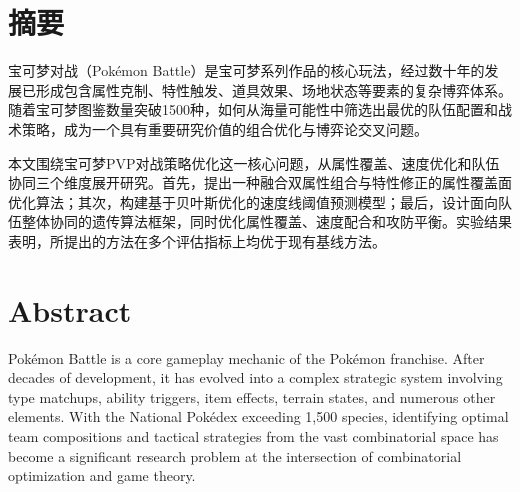 \maketitle%
\MAKETITLE%
\makedeclaration%
\intobmk\chapter*{摘\quad 要}%
\setcounter{page}{1}%

宝可梦对战（Pokémon Battle）是宝可梦系列作品的核心玩法，经过数十年的发展已形成包含属性克制、特性触发、道具效果、场地状态等要素的复杂博弈体系。随着宝可梦图鉴数量突破1500种，如何从海量可能性中筛选出最优的队伍配置和战术策略，成为一个具有重要研究价值的组合优化与博弈论交叉问题。

本文围绕宝可梦PVP对战策略优化这一核心问题，从属性覆盖、速度优化和队伍协同三个维度展开研究。首先，提出一种融合双属性组合与特性修正的属性覆盖面优化算法；其次，构建基于贝叶斯优化的速度线阈值预测模型；最后，设计面向队伍整体协同的遗传算法框架，同时优化属性覆盖、速度配合和攻防平衡。实验结果表明，所提出的方法在多个评估指标上均优于现有基线方法。

\intobmk\chapter*{Abstract}%

Pokémon Battle is a core gameplay mechanic of the Pokémon franchise. After decades of development, it has evolved into a complex strategic system involving type matchups, ability triggers, item effects, terrain states, and numerous other elements. With the National Pokédex exceeding 1,500 species, identifying optimal team compositions and tactical strategies from the vast combinatorial space has become a significant research problem at the intersection of combinatorial optimization and game theory.

